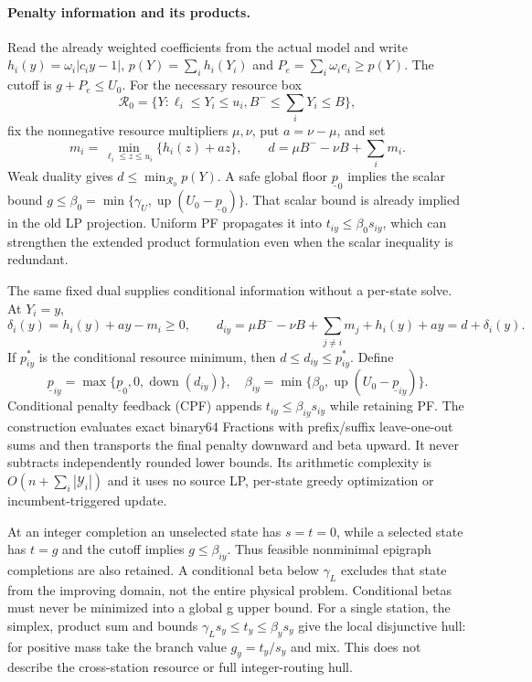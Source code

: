 \paragraph{Penalty information and its products.}
Read the already weighted coefficients from the actual model and write
$h_i(y)=\omega_i|c_i y-1|$, $p(Y)=\sum_i h_i(Y_i)$ and
$P_e=\sum_i\omega_i e_i\ge p(Y)$. The cutoff is $g+P_e\le U_0$.
For the necessary resource box
\[
\mathcal R_0=\{Y:\ell_i\le Y_i\le u_i,
 B^-\le\sum_iY_i\le B\},
\]
fix the nonnegative resource multipliers $\mu,\nu$, put $a=\nu-\mu$, and set
\[
m_i=\min_{\ell_i\le z\le u_i}\{h_i(z)+az\},\qquad
d=\mu B^- -\nu B+\sum_i m_i.
\]
Weak duality gives $d\le\min_{\mathcal R_0}p(Y)$. A safe global floor
$\underline p_0$ implies the scalar bound
$g\le\beta_0=\min\{\gamma_U,\operatorname{up}(U_0-\underline p_0)\}$.
That scalar bound is already implied in the old LP projection. Uniform PF
propagates it into $t_{iy}\le\beta_0s_{iy}$, which can strengthen the
extended product formulation even when the scalar inequality is redundant.

The same fixed dual supplies conditional information without a per-state
solve. At $Y_i=y$,
\[
\delta_i(y)=h_i(y)+ay-m_i\ge0,\qquad
d_{iy}=\mu B^- -\nu B+\sum_{j\ne i}m_j+h_i(y)+ay=d+\delta_i(y).
\]
If $p^*_{iy}$ is the conditional resource minimum, then
$d\le d_{iy}\le p^*_{iy}$. Define
\[
\underline p_{iy}=\max\{\underline p_0,0,\operatorname{down}(d_{iy})\},
\quad
\beta_{iy}=\min\{\beta_0,\operatorname{up}(U_0-\underline p_{iy})\}.
\]
Conditional penalty feedback (CPF) appends
$t_{iy}\le\beta_{iy}s_{iy}$ while retaining PF. The construction evaluates
exact binary64 Fractions with prefix/suffix leave-one-out sums and then
transports the final penalty downward and beta upward. It never subtracts
independently rounded lower bounds. Its arithmetic complexity is
$O(n+\sum_i|\mathcal Y_i|)$ and it uses no source LP, per-state greedy
optimization or incumbent-triggered update.

At an integer completion an unselected state has $s=t=0$, while a selected
state has $t=g$ and the cutoff implies $g\le\beta_{iy}$. Thus feasible
nonminimal epigraph completions are also retained. A conditional beta below
$\gamma_L$ excludes that state from the improving domain, not the entire
physical problem. Conditional betas must never be minimized into a global
g upper bound. For a single station, the simplex, product sum and bounds
$\gamma_Ls_y\le t_y\le\beta_ys_y$ give the local disjunctive hull: for
positive mass take the branch value $g_y=t_y/s_y$ and mix. This does not
describe the cross-station resource or full integer-routing hull.

